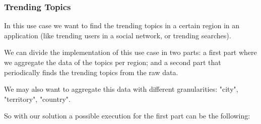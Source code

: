 \subsubsection{Trending Topics}
In this use case we want to find the trending topics in a certain region in an application (like trending users in a social network, or trending searches).

We can divide the implementation of this use case in two parts: a first part where we aggregate the data of the topics per region; and a second part that periodically finds the trending topics from the raw data.

We may also want to aggregate this data with different granularities: "city", "territory", "country".

So with our solution a possible execution for the first part can be the following:
